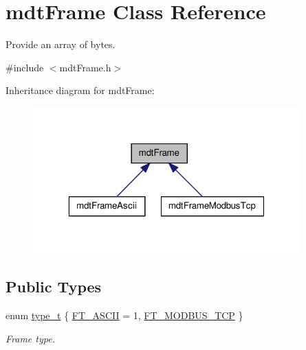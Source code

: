 \hypertarget{classmdt_frame}{
\section{mdtFrame Class Reference}
\label{classmdt_frame}
}


Provide an array of bytes.  




{\ttfamily \#include $<$mdtFrame.h$>$}



Inheritance diagram for mdtFrame:\nopagebreak
\begin{figure}[H]
\begin{center}
\leavevmode
\includegraphics[width=292pt]{classmdt_frame__inherit__graph}
\end{center}
\end{figure}
\subsection*{Public Types}
\begin{DoxyCompactItemize}
\item 
enum \hyperlink{classmdt_frame_af936e37d5fe4c066c0fb0161fafd4a17}{type\_\-t} \{ \hyperlink{classmdt_frame_af936e37d5fe4c066c0fb0161fafd4a17ac649559564652abbe656b97d4a84b722}{FT\_\-ASCII} =  1, 
\hyperlink{classmdt_frame_af936e37d5fe4c066c0fb0161fafd4a17a72c8ddaf29839f4037b686bdc346828a}{FT\_\-MODBUS\_\-TCP}
 \}
\begin{DoxyCompactList}\small\item\em Frame type. \end{DoxyCompactList}\end{DoxyCompactItemize}
